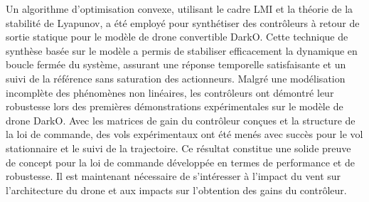 Un algorithme d'optimisation convexe, utilisant le cadre LMI et la théorie de la stabilité de Lyapunov, a été employé pour synthétiser des contrôleurs à retour de sortie statique pour le modèle de drone convertible DarkO. Cette technique de synthèse basée sur le modèle a permis de stabiliser efficacement la dynamique en boucle fermée du système, assurant une réponse temporelle satisfaisante et un suivi de la référence sans saturation des actionneurs. Malgré une modélisation incomplète des phénomènes non linéaires, les contrôleurs ont démontré leur robustesse lors des premières démonstrations expérimentales sur le modèle de drone DarkO. Avec les matrices de gain du contrôleur conçues et la structure de la loi de commande, des vols expérimentaux ont été menés avec succès pour le vol stationnaire et le suivi de la trajectoire. Ce résultat constitue une solide preuve de concept pour la loi de commande développée en termes de performance et de robustesse.
Il est maintenant nécessaire de s'intéresser à l'impact du vent sur l'architecture du drone et aux impacts sur l'obtention des gains du contrôleur.
